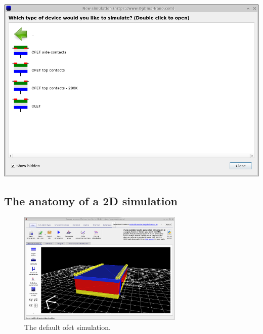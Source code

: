 \hspace{4pt}
\begin{minipage}[]{0.5\linewidth}
	\centering
	\includegraphics[width=\linewidth,height=0.8\linewidth]{./images/ofet/ofet_new_sim1.png}
	\label{fig:ofetnewsim1}
\end{minipage}


\subsection{The anatomy of a 2D simulation}

\begin{figure}[H]
\centering
\includegraphics[width=0.7\textwidth]{./images/ofet/ofet_1.png}
\caption{The default ofet simulation.}
\label{fig:ofetstartsim}
\end{figure}

